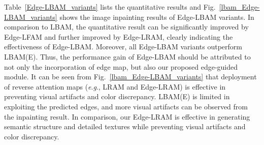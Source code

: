 \documentclass[10pt,journal,compsoc]{IEEEtran}
\newcommand{\ie}{\textit{i}.\textit{e}.}
\newcommand{\eg}{\textit{e}.\textit{g}.}
\begin{document}
Table~\ref{Edge-LBAM_variants} lists the quantitative results and Fig.~\ref{lbam_Edge-LBAM_variants} shows the image inpainting results of Edge-LBAM variants.
%
In comparison to LBAM, the quantitative result can be significantly improved by Edge-LFAM and further improved by Edge-LRAM, clearly indicating the effectiveness of Edge-LBAM.
%
Moreover, all Edge-LBAM variants outperform LBAM(E).
%
Thus, the performance gain of Edge-LBAM should be attributed to not only the incorporation of edge map, but also our proposed edge-guided module.
%
It can be seen from Fig.~\ref{lbam_Edge-LBAM_variants} that deployment of reverse attention maps (\eg, LRAM and Edge-LRAM) is effective in preventing visual artifacts and color discrepancy.
%
LBAM(E) is limited in exploiting the predicted edges, and more visual artifacts can be observed from the inpainting result.
%
In comparison, our Edge-LRAM is effective in generating semantic structure and detailed textures while preventing visual artifacts and color discrepancy.


%
\end{document}
